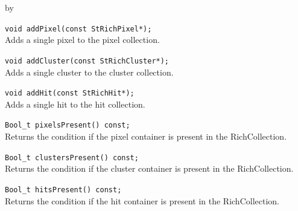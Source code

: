 \documentclass[twoside]{article}
\newcommand{\entrylabel}[1]{\mbox{\textbf{{#1}}}\hfil}%
\newenvironment{entry}
{\begin{list}{}%
    {\renewcommand{\makelabel}{\entrylabel}%
     \setlength{\labelwidth}{90pt}%
     \setlength{\leftmargin}{\labelwidth}
     \advance\leftmargin by \labelsep%
      }%
    }%
  {\end{list}}
\newcommand{\Entrylabel}[1]%
{\raisebox{0pt}[1ex][0pt]{\makebox[\labelwidth][l]%
    {\parbox[t]{\labelwidth}{\hspace{0pt}\textbf{{#1}}}}}}
\newenvironment{Entry}%
{\renewcommand{\entrylabel}{\Entrylabel}\begin{entry}}%
  {\end{entry}}
\begin{document}
\begin{Entry}
    \verb+void addPixel(const StRichPixel*);+\\
    Adds a single pixel to the pixel collection.

    \verb+void addCluster(const StRichCluster*);+\\
    Adds a single cluster to the cluster collection.

    \verb+void addHit(const StRichHit*);+\\
    Adds a single hit to the hit collection.

    \verb+Bool_t pixelsPresent() const;+\\
    Returns the condition if the pixel container
    is present in the RichCollection.

    \verb+Bool_t clustersPresent() const;+\\
    Returns the condition if the cluster container
    is present in the RichCollection.

    \verb+Bool_t hitsPresent() const;+\\
    Returns the condition if the hit container
    is present in the RichCollection.
\end{Entry}
\clearpage
\end{document}
